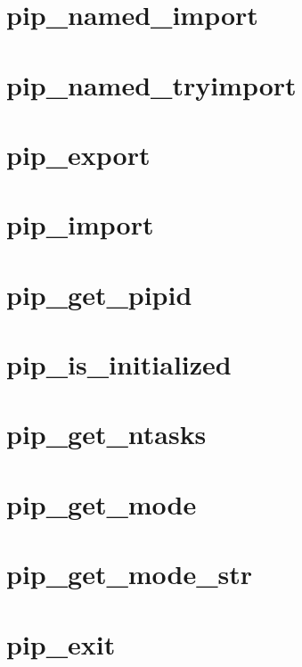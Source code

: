\documentclass[twoside]{book}
\begin{document}
\chapter{pip\-\_\-named\-\_\-import}
\label{pip_named_import}
\hypertarget{pip_named_import}{}

\chapter{pip\-\_\-named\-\_\-tryimport}
\label{pip_named_tryimport}
\hypertarget{pip_named_tryimport}{}

\chapter{pip\-\_\-export}
\label{pip_export}
\hypertarget{pip_export}{}

\chapter{pip\-\_\-import}
\label{pip_import}
\hypertarget{pip_import}{}

\chapter{pip\-\_\-get\-\_\-pipid}
\label{pip_get_pipid}
\hypertarget{pip_get_pipid}{}

\chapter{pip\-\_\-is\-\_\-initialized}
\label{pip_is_initialized}
\hypertarget{pip_is_initialized}{}

\chapter{pip\-\_\-get\-\_\-ntasks}
\label{pip_get_ntasks}
\hypertarget{pip_get_ntasks}{}

\chapter{pip\-\_\-get\-\_\-mode}
\label{pip_get_mode}
\hypertarget{pip_get_mode}{}

\chapter{pip\-\_\-get\-\_\-mode\-\_\-str}
\label{pip_get_mode_str}
\hypertarget{pip_get_mode_str}{}

\chapter{pip\-\_\-exit}
\label{pip_exit}
\hypertarget{pip_exit}{}

\end{document}
